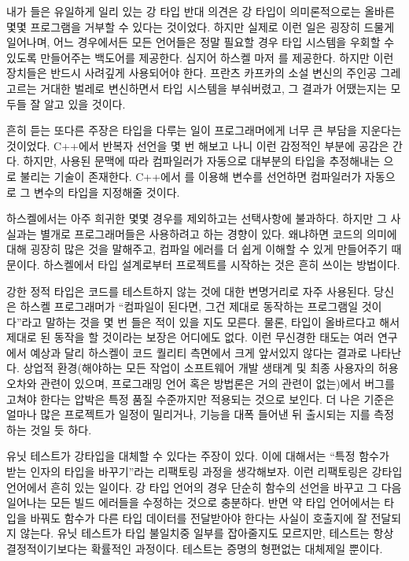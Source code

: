 내가 들은 유일하게 일리 있는 강 타입 반대 의견은 강 타입이 의미론적으로는 올바른 몇몇 프로그램을 거부할 수 있다는 것이었다.
하지만 실제로 이런 일은 굉장히 드물게 일어나며, 어느 경우에서든 모든 언어들은 정말 필요할 경우 타입 시스템을 우회할 수 있도록 만들어주는 백도어를 제공한다.
심지어 하스켈 마저 를 제공한다. 하지만 이런 장치들은 반드시 사려깊게 사용되어야 한다.
프란츠 카프카의 소설 변신의 주인공 그레고르는 거대한 벌레로 변신하면서 타입 시스템을 부숴버렸고, 그 결과가 어땠는지는 모두들 잘 알고 있을 것이다.

흔히 듣는 또다른 주장은 타입을 다루는 일이 프로그래머에게 너무 큰 부담을 지운다는 것이었다. 
C++에서 반복자 선언을 몇 번 해보고 나니 이런 감정적인 부분에 공감은 간다.
하지만, 사용된 문맥에 따라 컴파일러가 자동으로 대부분의 타입을 추정해내는 \newterm{\trTypeInference}으로 불리는 기술이 존재한다.
C++에서 를 이용해 변수를 선언하면 컴파일러가 자동으로 그 변수의 타입을 지정해줄 것이다.

하스켈에서는 아주 희귀한 몇몇 경우를 제외하고는 \trTypeAnnotation\은 선택사항에 불과하다.
하지만 그 사실과는 별개로 프로그래머들은 \trTypeAnnotation\을 사용하려고 하는 경향이 있다.
왜냐하면 \trTypeAnnotation\은 코드의 의미에 대해 굉장히 많은 것을 말해주고, 컴파일 에러를 더 쉽게 이해할 수 있게 만들어주기 때문이다.
하스켈에서 타입 설계로부터 프로젝트를 시작하는 것은 흔히 쓰이는 방법이다. 

강한 정적 타입은 코드를 테스트하지 않는 것에 대한 변명거리로 자주 사용된다.
당신은 하스켈 프로그래머가 ``컴파일이 된다면, 그건 제대로 동작하는 프로그램일 것이다''라고 말하는 것을 몇 번 들은 적이 있을 지도 모른다.
물론, 타입이 올바르다고 해서 제대로 된 동작을 할 것이라는 보장은 어디에도 없다.
이런 무신경한 태도는 여러 연구에서 예상과 달리 하스켈이 코드 퀄리티 측면에서 크게 앞서있지 않다는 결과로 나타난다.
상업적 환경(해야하는 모든 작업이 소프트웨어 개발 생태계 및 최종 사용자의 허용 오차와 관련이 있으며, 프로그래밍 언어 혹은 방법론은 거의 관련이 없는)에서 버그를 고쳐야 한다는 압박은 특정 품질 수준까지만 적용되는 것으로 보인다.
더 나은 기준은 얼마나 많은 프로젝트가 일정이 밀리거나, 기능을 대폭 들어낸 뒤 출시되는 지를 측정하는 것일 듯 하다.

유닛 테스트가 강타입을 대체할 수 있다는 주장이 있다. 이에 대해서는 ``특정 함수가 받는 인자의 타입을 바꾸기''라는 리팩토링 과정을 생각해보자. 이런 리팩토링은 강타입 언어에서 흔히 있는 일이다.
강 타입 언어의 경우 단순히 함수의 선언을 바꾸고 그 다음 일어나는 모든 빌드 에러들을 수정하는 것으로 충분하다.
반면 약 타입 언어에서는 타입을 바꿔도 함수가 다른 타입 데이터를 전달받아야 한다는 사실이 호출지에 잘 전달되지 않는다.
유닛 테스트가 타입 불일치중 일부를 잡아줄지도 모르지만, 테스트는 항상 결정적이기보다는 확률적인 과정이다. 테스트는 증명의 형편없는 대체제일 뿐이다.

